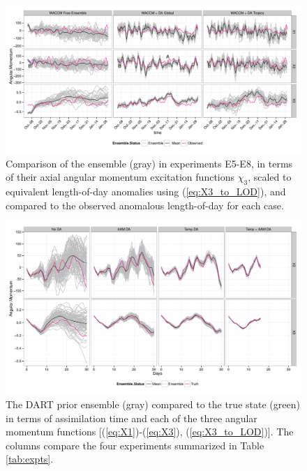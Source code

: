 \begin{figure}
	 \includegraphics[width=\textwidth]{Paper_figures/ERPDA_paper_evalvariable_aam_space.pdf}
	 \caption{Comparison of the ensemble (gray) in experiments E5-E8, in terms of their axial angular momentum excitation functions $\chi_3$, scaled to equivalent length-of-day anomalies using (\ref{eq:X3_to_LOD}), and compared to the observed anomalous length-of-day for each case.}
	 \label{fig:evalvariable_aam}
\end{figure}

\begin{figure}[p]
\includegraphics[width=\textwidth]{Paper_figures/ERPDA_paper_erpda_obs_space.pdf} 
 \caption{ The DART prior ensemble (gray) compared to the true state (green) in terms of assimilation time and each of the three angular momentum functions [(\ref{eq:X1})-(\ref{eq:X3}), (\ref{eq:X3_to_LOD})].  The columns compare the four experiments summarized in Table \ref{tab:expts}.  }
 \label{fig:fit_to_ERPs}
\end{figure}

